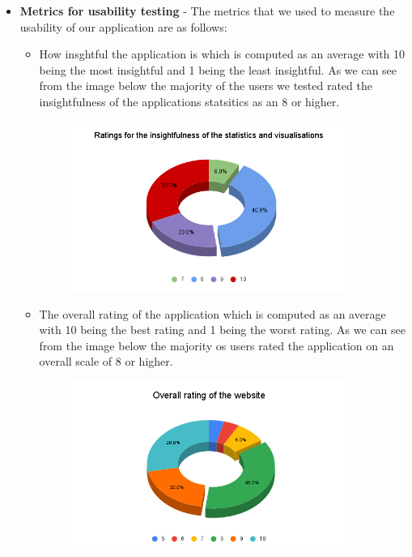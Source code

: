 \documentclass[12pt]{article}
\begin{document}
\begin{itemize}
    \item \textbf{Metrics for usability testing} - The metrics that we used to measure the usability of our application are as follows:
          \begin{itemize}
              \item How insghtful the application is which is computed as an average with 10 being the most insightful and 1 being the least insightful. As we can see from the image below the majority of the users we tested rated the insightfulness of the applications statsitics as an 8 or higher.
              \begin{figure}[H]
                \centering
                \includegraphics[width=0.9\textwidth]{piechart.png}
              \end{figure}
              \item The overall rating of the application which is computed as an average with 10 being the best rating and 1 being the worst rating. As we can see from the image below the majority os users rated the application on an overall scale of 8 or higher.
              \begin{figure}[H]
                \centering
                \includegraphics[width=0.9\textwidth]{Overall rating of the website.png}

\end{figure}
\end{itemize}
\end{itemize}
\end{document}
